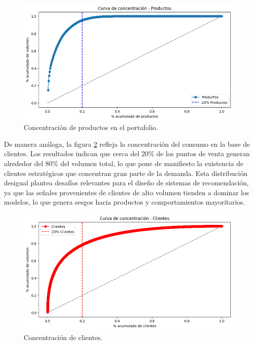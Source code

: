 \begin{figure}[htpb]
	\centering
	\includegraphics[scale=.55]{./Figures/concentracion_productos.png}
	\caption{Concentración de productos en el portafolio.}
	\label{fig:concentracion_productos}
\end{figure}

De manera análoga, la figura \ref{fig:concentracion_clientes} refleja la concentración del consumo en la base de clientes. Los resultados indican que cerca del 20\% de los puntos de venta generan alrededor del 80\% del volumen total, lo que pone de manifiesto la existencia de clientes estratégicos que concentran gran parte de la demanda. Esta distribución desigual plantea desafíos relevantes para el diseño de sistemas de recomendación, ya que las señales provenientes de clientes de alto volumen tienden a dominar los modelos, lo que genera sesgos hacia productos y comportamientos mayoritarios.

\begin{figure}[htpb]
	\centering
	\includegraphics[scale=.55]{./Figures/concentracion_clientes.png}
	\caption{Concentración de clientes.}
	\label{fig:concentracion_clientes}
\end{figure}

